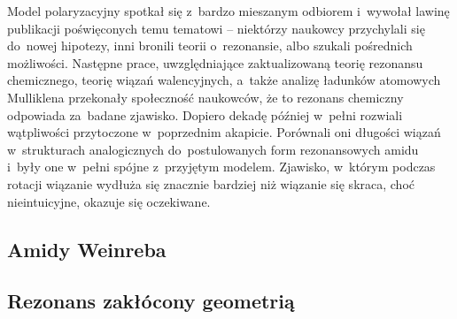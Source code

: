 Model polaryzacyjny spotkał się z~bardzo mieszanym odbiorem i~wywołał lawinę publikacji
  poświęconych temu tematowi \--- niektórzy naukowcy przychylali się do~nowej hipotezy,
  inni bronili teorii o~rezonansie, albo szukali pośrednich możliwości.
Następne prace, uwzględniające zaktualizowaną teorię rezonansu chemicznego,
  teorię wiązań walencyjnych, a~także analizę ładunków atomowych
  Mulliklena przekonały społeczność naukowców, że to rezonans chemiczny
  odpowiada za~badane zjawisko.
Dopiero dekadę później \citeauthor{kemnitz07} w~pełni rozwiali wątpliwości przytoczone
  w~poprzednim akapicie.
Porównali oni długości wiązań w~strukturach analogicznych do~postulowanych form rezonansowych
  amidu i~były one w~pełni spójne z~przyjętym modelem.
Zjawisko, w~którym podczas rotacji wiązanie  wydłuża się znacznie bardziej niż
  wiązanie  się skraca, choć nieintuicyjne, okazuje się oczekiwane. 

\subsection{Amidy Weinreba}\label{literature:structure:weinreb}
\subsection{Rezonans zakłócony geometrią}\label{literature:structure:geometry}

